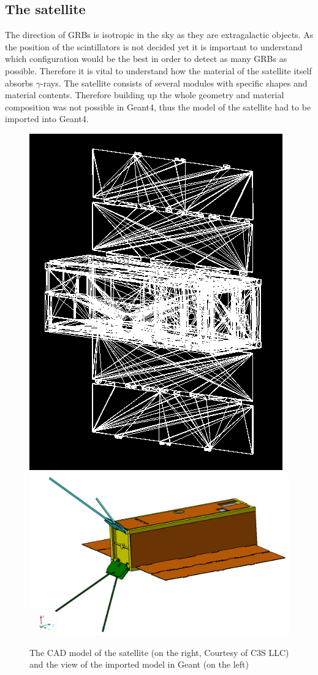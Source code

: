 \documentclass[12pt, a4paper,titlepage]{article}
\numberwithin{equation}{section}
\numberwithin{figure}{section}
\begin{document}
\pagebreak

\subsection{The satellite}

The direction of GRBs is isotropic in the sky as they are extragalactic objects. As the position of the scintillators is not decided yet it is important to understand which configuration would be the best in order to detect as many GRBs as possible. Therefore it is vital to understand how the material of the satellite itself absorbs $\gamma$-rays. The satellite consists of several modules with specific shapes and material contents. Therefore building up the whole geometry and material composition was not possible in Geant4, thus the model of the satellite had to be  imported into Geant4.

\begin{figure}[h!]
 \centering %
 \includegraphics[width=.35\textwidth,origin=c,angle=0]{images/satellite.png}
 \qquad
 \includegraphics[width=.5\textwidth,origin=c,angle=90]{images/cad_sat.png} 
 \caption{\label{fig:i} The CAD model of the satellite \cite{drawing} (on the right, Courtesy of C3S LLC) and the view of the imported model in Geant (on the left)}
 \end{figure}
\end{document}
